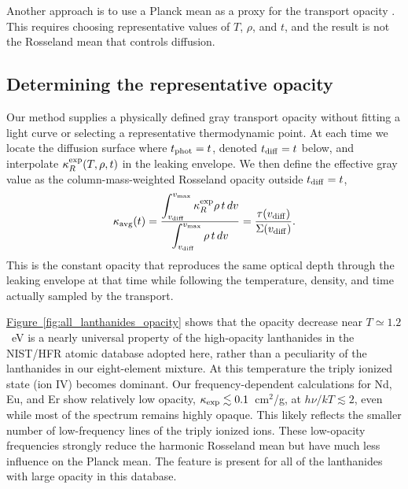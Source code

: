 \documentclass[final,5p,times,twocolumn]{elsarticle}
\DeclareRobustCommand{\figref}[1]{\hyperref[#1]{Figure~\ref*{#1}}}
\begin{document}
    Another approach is to use a Planck mean as a proxy for the transport opacity
    \cite{tanaka2020systematic}. This requires choosing representative values of $T$, $\rho$, and
    $t$, and the result is not the Rosseland mean that controls diffusion.

    \subsection{Determining the representative opacity}
    \label{SecRepresentativeOpacity}

    Our method supplies a physically defined gray transport opacity without fitting a light curve
    or selecting a representative thermodynamic point. At each time we locate the diffusion surface
    where $t_{\rm phot}=t$, denoted $t_{\rm diff}=t$ below, and interpolate
    $\kappa_R^{\rm exp}(T,\rho,t)$ in the leaking envelope. We then define the
    effective gray value as the column-mass-weighted Rosseland opacity outside
    $t_{\rm diff}=t$,
    \begin{equation}
        \kappa_{\rm avg}(t)=
        \frac{\displaystyle\int_{v_{\rm diff}}^{v_{\rm max}}
            \kappa_R^{\rm exp}\rho\,t\,dv}
            {\displaystyle\int_{v_{\rm diff}}^{v_{\rm max}}\rho\,t\,dv}
        =\frac{\tau(v_{\rm diff})}{\Sigma(v_{\rm diff})}.
        \label{eq:kappa_avg}
    \end{equation}
    This is the constant opacity that reproduces the same optical depth through the leaking
    envelope at that time while following the temperature, density, and time actually sampled by
    the transport.

    \figref{fig:all_lanthanides_opacity} shows that the opacity decrease near
    $T\simeq1.2$~eV is a nearly universal property of the high-opacity lanthanides in the
    NIST/HFR atomic database adopted here, rather than a peculiarity of the lanthanides in our
    eight-element mixture. At this temperature the triply ionized state (ion IV) becomes dominant.
    Our frequency-dependent calculations for Nd, Eu, and Er show relatively low opacity,
    $\kappa_{\rm exp}\lesssim0.1$~cm$^2$/g, at $h\nu/kT\lesssim2$, even while most of the spectrum
    remains highly opaque. This likely reflects the smaller number of low-frequency lines of the
    triply ionized ions. These low-opacity frequencies strongly reduce the harmonic Rosseland mean
    but have much less influence on the Planck mean. The feature is present for all of
    the lanthanides with large opacity in this database.
\end{document}

